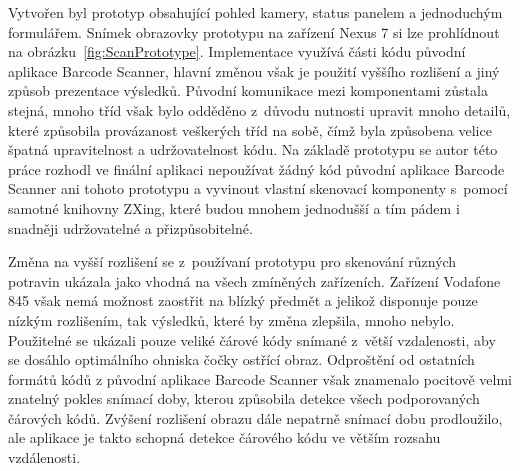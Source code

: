 \documentclass[thesis=B,czech]{FITthesis}[2013/10/20]
\begin{document}
Vytvořen byl prototyp obsahující pohled kamery, status panelem a jednoduchým formulářem. Snímek obrazovky prototypu na zařízení Nexus 7 si lze prohlídnout na obrázku~\ref{fig:ScanPrototype}. Implementace využívá části kódu původní aplikace Barcode Scanner, hlavní změnou však je použití vyššího rozlišení a jiný způsob prezentace výsledků. Původní komunikace mezi komponentami zůstala stejná, mnoho tříd však bylo odděděno z~důvodu nutnosti upravit mnoho detailů, které způsobila provázanost veškerých tříd na sobě, čímž byla způsobena velice špatná upravitelnost a udržovatelnost kódu. Na základě prototypu se autor této práce rozhodl ve finální aplikaci nepoužívat žádný kód původní aplikace Barcode Scanner ani tohoto prototypu a vyvinout vlastní skenovací komponenty s~pomocí samotné knihovny ZXing, které budou mnohem jednodušší a tím pádem i snadněji udržovatelné a přizpůsobitelné.

Změna na vyšší rozlišení se z~používaní prototypu pro skenování různých potravin ukázala jako vhodná na všech zmíněných zařízeních. Zařízení Vodafone 845 však nemá možnost zaostřit na blízký předmět a jelikož disponuje pouze nízkým rozlišením, tak výsledků, které by změna zlepšila, mnoho nebylo. Použitelné se ukázali pouze veliké čárové kódy snímané z~větší vzdalenosti, aby se dosáhlo optimálního ohniska čočky ostřící obraz. Odproštění od ostatních formátů kódů z původní aplikace Barcode Scanner však znamenalo pocitově velmi znatelný pokles snímací doby, kterou způsobila detekce všech podporovaných čárových kódů. Zvýšení rozlišení obrazu dále nepatrně snímací dobu prodloužilo, ale aplikace je takto schopná detekce čárového kódu ve větším rozsahu vzdálenosti.
\end{document}
